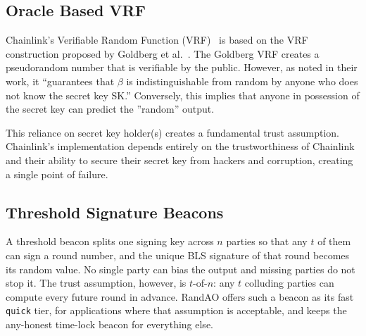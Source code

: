 \subsection{Oracle Based VRF}\label{sec:oracle_based_vrf}
Chainlink's Verifiable Random Function (VRF)~\cite{chainlink_vrf} is based on the VRF construction proposed by Goldberg et al.~\cite{goldbergVRF}. The Goldberg VRF creates a pseudorandom number that is verifiable by the public. However, as noted in their work, it ``guarantees that $\beta$ is indistinguishable from random by anyone who does not know the secret key SK.'' Conversely, this implies that anyone in possession of the secret key can predict the ''random'' output.

This reliance on secret key holder(s) creates a fundamental trust assumption. Chainlink's implementation depends entirely on the trustworthiness of Chainlink and their ability to secure their secret key from hackers and corruption, creating a single point of failure.

\subsection{Threshold Signature Beacons}\label{sec:threshold_beacons}
A threshold beacon splits one signing key across $n$ parties so that any $t$ of them can sign a round number, and the unique BLS signature of that round becomes its random value. No single party can bias the output and missing parties do not stop it. The trust assumption, however, is $t$-of-$n$: any $t$ colluding parties can compute every future round in advance. RandAO offers such a beacon as its fast \texttt{quick} tier, for applications where that assumption is acceptable, and keeps the any-honest time-lock beacon for everything else.
